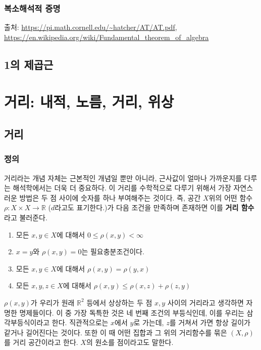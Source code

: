 \subsection{복소해석적 증명}

출처: \url{https://pi.math.cornell.edu/~hatcher/AT/AT.pdf}, \url{https://en.wikipedia.org/wiki/Fundamental_theorem_of_algebra}
\section{1의 제곱근}

\chapter{거리: 내적, 노름, 거리, 위상}
\label{chap:metrictop}

\section{거리}

\subsection{정의}

거리라는 개념 자체는 근본적인 개념일 뿐만 아니라, 근사값이 얼마나 가까운지를 다루는 해석학에서는 더욱 더 중요하다.
이 거리를 수학적으로 다루기 위해서 가장 자연스러운 방법은 두 점 사이에 숫자를 하나 부여해주는 것이다.
즉, 공간 $X$위의 어떤 함수 $\rho:X \times X \to \mathbb{R}$ ($d$라고도 표기한다.)가 다음 조건을 만족하며 존재하면 이를 \textbf{거리 함수}라고 불러준다.

\begin{enumerate}
    \item 모든 $x, y \in X$에 대해서 $0 \leq \rho(x, y) < \infty$
    \item $x=y$와 $\rho(x, y) = 0$는 필요충분조건이다.
    \item 모든 $x, y \in X$에 대해서 $\rho(x, y) = \rho(y, x)$
    \item 모든 $x, y, z \in X$에 대해서 $\rho(x, y) \leq \rho(x,z) + \rho(z, y)$
\end{enumerate}

$\rho(x, y)$가 우리가 원래 $\mathbb{R}^2$ 등에서 상상하는 두 점 $x, y$ 사이의 거리라고 생각하면 자명한 명제들이다.
이 중 가장 독특한 것은 네 번째 조건의 부등식인데, 이를 우리는 삼각부등식이라고 한다. 
직관적으로는 $x$에서 $y$로 가는데, $z$를 거쳐서 가면 항상 길이가 같거나 길어진다는 것이다.
또한 이 때 어떤 집합과 그 위의 거리함수를 묶은 $(X, \rho)$를 거리 공간이라고 한다.
$X$의 원소를 점이라고도 말한다.

